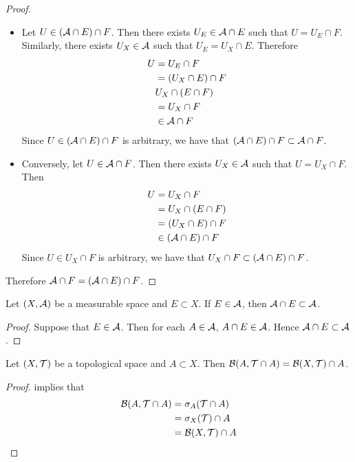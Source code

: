 \documentclass{book}
\begin{document}
	\begin{proof}\
		\begin{itemize}
			\item Let $U \in (\mathcal{A} \cap E) \cap F$. Then there exists $U_E \in \mathcal{A} \cap E$ such that $U = U_E \cap F$. Similarly, there exists $U_X \in \mathcal{A}$ such that $U_E = U_X \cap E$. Therefore 
			\begin{align*}
				U
				& = U_E \cap F \\
				& = (U_X \cap E) \cap F \\
				& U_X \cap (E \cap F) \\
				& = U_X \cap F \\
				& \in \mathcal{A} \cap F
			\end{align*}
			Since $U \in (\mathcal{A} \cap E) \cap F$ is arbitrary, we have that $(\mathcal{A} \cap E) \cap F \subset \mathcal{A} \cap F$. \\
			\item Conversely, let $U \in \mathcal{A} \cap F$. Then there exists $U_X \in \mathcal{A}$ such that $U = U_X \cap F$. Then 
			\begin{align*}
				U
				& = U_X \cap F \\
				& = U_X \cap (E \cap F) \\
				& = (U_X \cap E) \cap F \\
				& \in (\mathcal{A} \cap E) \cap F
			\end{align*}
			Since $U \in U_X \cap F$ is arbitrary, we have that $U_X \cap F \subset (\mathcal{A} \cap E) \cap F$. 
		\end{itemize}
		Therefore $\mathcal{A} \cap F = (\mathcal{A} \cap E) \cap F$.
	\end{proof}

	\begin{ex}  
		Let $(X, \mathcal{A})$ be a measurable space and $E \subset X$. If $E \in \mathcal{A}$, then $\mathcal{A} \cap E \subset \mathcal{A}$.
	\end{ex}

	\begin{proof}
		Suppose that $E \in \mathcal{A}$. Then for each $A \in \mathcal{A}$, $A \cap E \in \mathcal{A}$. Hence $\mathcal{A} \cap E \subset \mathcal{A}$.
	\end{proof}

	\begin{ex} 
		Let $(X, \mathcal{T})$ be a topological space and $A \subset X$. Then $\mathcal{B}(A, \mathcal{T} \cap A) = \mathcal{B}(X, \mathcal{T}) \cap A$.
	\end{ex}

	\begin{proof}
		 implies that 
		\begin{align*}
			\mathcal{B}(A, \mathcal{T} \cap A) 
			& = \sigma_A(\mathcal{T} \cap A) \\
			& = \sigma_X(\mathcal{T}) \cap A \\
			& = \mathcal{B}(X, \mathcal{T}) \cap A
		\end{align*}
	\end{proof}
\end{document}
